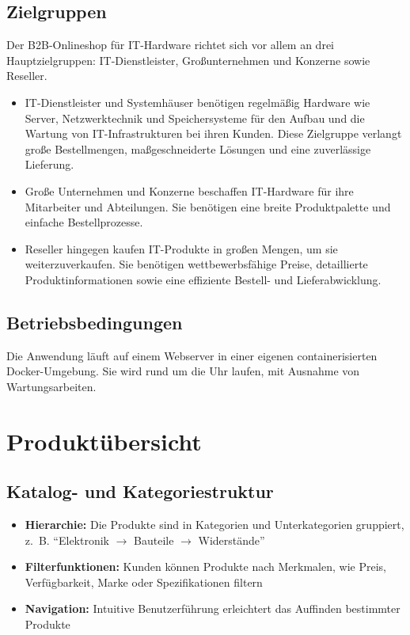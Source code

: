 \documentclass[%
	ngerman,
	12pt,
	a4paper,
	oneside
]{scrbook}
\begin{document}
\section{Zielgruppen}
Der B2B-Onlineshop für IT-Hardware richtet sich vor allem an drei Hauptzielgruppen:
IT-Dienstleister, Großunternehmen und Konzerne sowie Reseller.
\begin{itemize}
	\item IT-Dienstleister und Systemhäuser benötigen regelmäßig Hardware wie Server, Netzwerktechnik und Speichersysteme für den Aufbau und die Wartung von IT-Infrastrukturen bei ihren Kunden.
	Diese Zielgruppe verlangt große Bestellmengen, maßgeschneiderte Lösungen und eine zuverlässige Lieferung.
	\item Große Unternehmen und Konzerne beschaffen IT-Hardware für ihre Mitarbeiter und Abteilungen.
	Sie benötigen eine breite Produktpalette und einfache Bestellprozesse.
	\item Reseller hingegen kaufen IT-Produkte in großen Mengen, um sie weiterzuverkaufen.
	Sie benötigen wettbewerbsfähige Preise, detaillierte Produktinformationen sowie eine effiziente Bestell- und Lieferabwicklung.
\end{itemize}
\section{Betriebsbedingungen}
Die Anwendung läuft auf einem Webserver in einer eigenen containerisierten Docker-Umgebung.
Sie wird rund um die Uhr laufen, mit Ausnahme von Wartungsarbeiten.

\chapter{Produktübersicht}
\section{Katalog- und Kategoriestruktur}
\begin{itemize}
	\item \textbf{Hierarchie:} Die Produkte sind in Kategorien und Unterkategorien gruppiert, z.~B. \enquote{Elektronik $\rightarrow$ Bauteile $\rightarrow$ Widerstände}
	\item \textbf{Filterfunktionen:} Kunden können Produkte nach Merkmalen, wie Preis, Verfügbarkeit, Marke oder Spezifikationen filtern
	\item \textbf{Navigation:} Intuitive Benutzerführung erleichtert das Auffinden bestimmter Produkte
\end{itemize}
\end{document}
